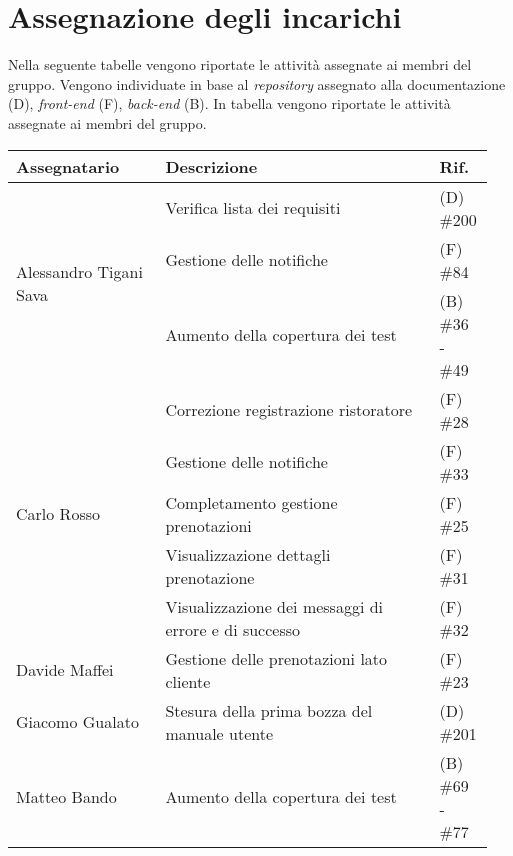 \section{Assegnazione degli incarichi}
Nella seguente tabelle vengono riportate le attività assegnate ai membri del 
gruppo. Vengono individuate in base al \textit{repository} assegnato alla 
documentazione (D), \textit{front-end} (F), \textit{back-end} (B).
In tabella vengono riportate le attività assegnate ai membri del gruppo.
\begin{center}
	{
		\renewcommand{\arraystretch}{1.5}
		\begin{tabular}{p{0.30\linewidth}|p{0.55\linewidth}|p{0.10\linewidth}}
			\textbf{Assegnatario}        & \textbf{Descrizione} & \textbf{Rif.} \\

			\hline
			\multirow{3}{*}{Alessandro Tigani Sava} & Verifica lista dei requisiti							& (D) \#200            \\ 
			\cline{2-3}
													& Gestione delle notifiche								& (F) \#84             \\
            \cline{2-3}
                                                    & Aumento della copertura dei test                      &  (B) \#36 - \#49                    \\
			\hline
			\multirow{5}{*}{Carlo Rosso}			& Correzione registrazione ristoratore					& (F) \#28				\\
			\cline{2-3}
													& Gestione delle notifiche								& (F) \#33            	\\
			\cline{2-3}
													& Completamento gestione prenotazioni					& (F) \#25            	\\
			\cline{2-3}
													& Visualizzazione dettagli prenotazione					& (F) \#31            	\\
			\cline{2-3}
													& Visualizzazione dei messaggi di errore e di successo	& (F) \#32            	\\
			\hline
			Davide Maffei							& Gestione delle prenotazioni lato cliente				& (F) \#23            	\\
			\hline
			Giacomo Gualato							& Stesura della prima bozza del manuale utente			& (D) \#201			\\
			\hline
			Matteo Bando							& Aumento della copertura dei test                      & (B) \#69 - \#77                \\
			\hline
		\end{tabular}
	}
\end{center}
